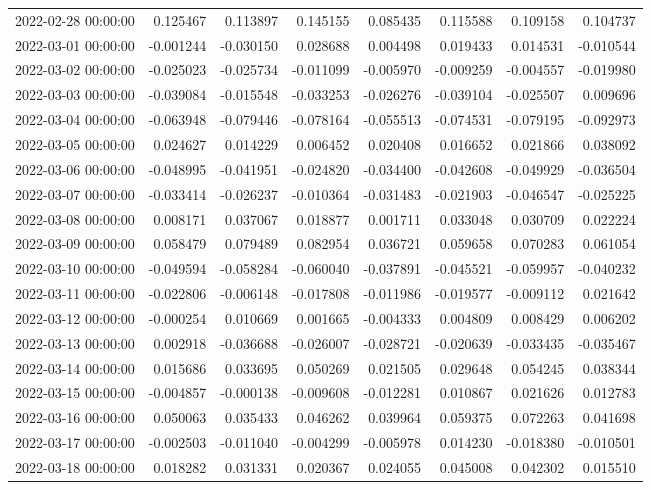 \begin{tabular}{lrrrrrrr}
2022-02-28 00:00:00 & 0.125467 & 0.113897 & 0.145155 & 0.085435 & 0.115588 & 0.109158 & 0.104737 \\
2022-03-01 00:00:00 & -0.001244 & -0.030150 & 0.028688 & 0.004498 & 0.019433 & 0.014531 & -0.010544 \\
2022-03-02 00:00:00 & -0.025023 & -0.025734 & -0.011099 & -0.005970 & -0.009259 & -0.004557 & -0.019980 \\
2022-03-03 00:00:00 & -0.039084 & -0.015548 & -0.033253 & -0.026276 & -0.039104 & -0.025507 & 0.009696 \\
2022-03-04 00:00:00 & -0.063948 & -0.079446 & -0.078164 & -0.055513 & -0.074531 & -0.079195 & -0.092973 \\
2022-03-05 00:00:00 & 0.024627 & 0.014229 & 0.006452 & 0.020408 & 0.016652 & 0.021866 & 0.038092 \\
2022-03-06 00:00:00 & -0.048995 & -0.041951 & -0.024820 & -0.034400 & -0.042608 & -0.049929 & -0.036504 \\
2022-03-07 00:00:00 & -0.033414 & -0.026237 & -0.010364 & -0.031483 & -0.021903 & -0.046547 & -0.025225 \\
2022-03-08 00:00:00 & 0.008171 & 0.037067 & 0.018877 & 0.001711 & 0.033048 & 0.030709 & 0.022224 \\
2022-03-09 00:00:00 & 0.058479 & 0.079489 & 0.082954 & 0.036721 & 0.059658 & 0.070283 & 0.061054 \\
2022-03-10 00:00:00 & -0.049594 & -0.058284 & -0.060040 & -0.037891 & -0.045521 & -0.059957 & -0.040232 \\
2022-03-11 00:00:00 & -0.022806 & -0.006148 & -0.017808 & -0.011986 & -0.019577 & -0.009112 & 0.021642 \\
2022-03-12 00:00:00 & -0.000254 & 0.010669 & 0.001665 & -0.004333 & 0.004809 & 0.008429 & 0.006202 \\
2022-03-13 00:00:00 & 0.002918 & -0.036688 & -0.026007 & -0.028721 & -0.020639 & -0.033435 & -0.035467 \\
2022-03-14 00:00:00 & 0.015686 & 0.033695 & 0.050269 & 0.021505 & 0.029648 & 0.054245 & 0.038344 \\
2022-03-15 00:00:00 & -0.004857 & -0.000138 & -0.009608 & -0.012281 & 0.010867 & 0.021626 & 0.012783 \\
2022-03-16 00:00:00 & 0.050063 & 0.035433 & 0.046262 & 0.039964 & 0.059375 & 0.072263 & 0.041698 \\
2022-03-17 00:00:00 & -0.002503 & -0.011040 & -0.004299 & -0.005978 & 0.014230 & -0.018380 & -0.010501 \\
2022-03-18 00:00:00 & 0.018282 & 0.031331 & 0.020367 & 0.024055 & 0.045008 & 0.042302 & 0.015510 \\

\end{tabular}

